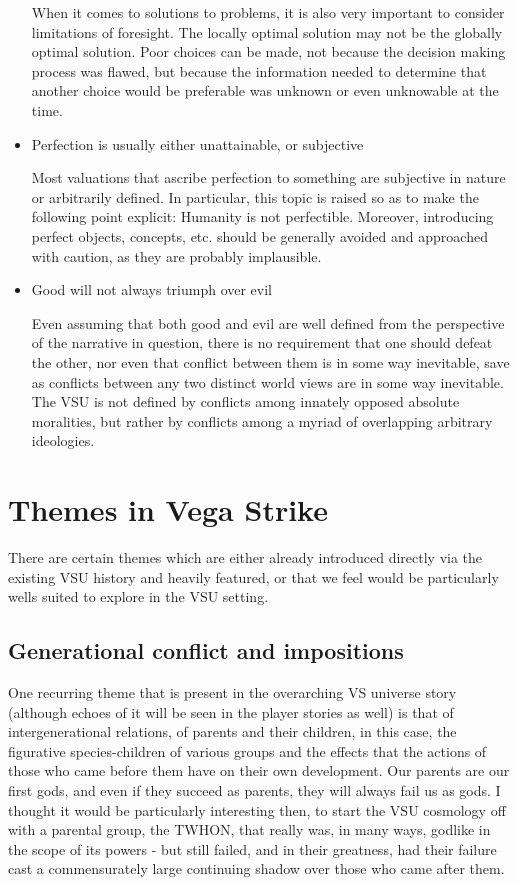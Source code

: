 \begin{itemize}
When it comes to solutions to problems, it is also very important to
consider limitations of foresight. The locally optimal solution may
not be the globally optimal solution. Poor choices can be made, not
because the decision making process was flawed, but because the
information needed to determine that another choice would be
preferable was unknown or even unknowable at the time.

\item Perfection is usually either unattainable, or subjective

Most valuations that ascribe perfection to something are subjective in
nature or arbitrarily defined. In particular, this topic is raised so
as to make the following point explicit: Humanity is not
perfectible. Moreover, introducing perfect objects, concepts,
etc. should be generally avoided and approached with caution, as they
are probably implausible.

\item Good will not always triumph over evil

Even assuming that both good and evil are well defined from the
perspective of the narrative in question, there is no requirement that
one should defeat the other, nor even that conflict between them is in
some way inevitable, save as conflicts between any two distinct world
views are in some way inevitable. The VSU is not defined by conflicts
among innately opposed absolute moralities, but rather by conflicts
among a myriad of overlapping arbitrary ideologies.

\end{itemize}


\section{Themes in Vega Strike}
\label{sec:VSthemes}
There are certain themes which are either already introduced directly
via the existing VSU history and heavily featured, or that we feel
would be particularly wells suited to explore in the VSU setting.

\subsection{Generational conflict and impositions}
One recurring theme that is present in the overarching VS universe
story (although echoes of it will be seen in the player stories as
well) is that of intergenerational relations, of parents and their
children, in this case, the figurative species-children of various
groups and the effects that the actions of those who came before them
have on their own development. Our parents are our first gods, and
even if they succeed as parents, they will always fail us as gods. I
thought it would be particularly interesting then, to start the VSU
cosmology off with a parental group, the TWHON, that really was, in
many ways, godlike in the scope of its powers - but still failed, and
in their greatness, had their failure cast a commensurately large
continuing shadow over those who came after them.

